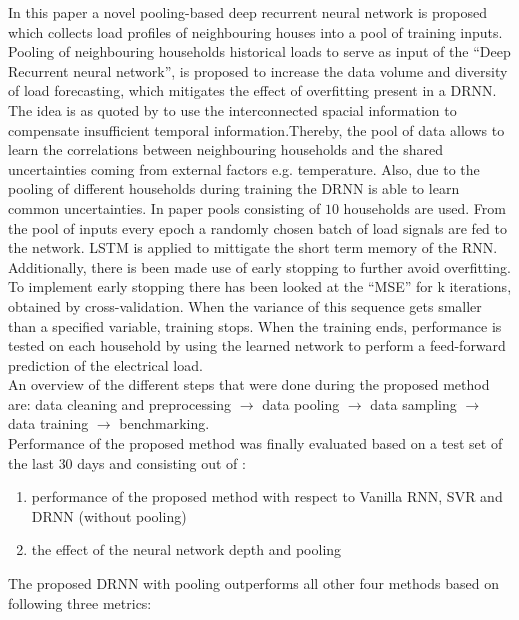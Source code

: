 In this paper \cite{Shi2018} a novel pooling-based deep recurrent neural network is proposed which collects load profiles of neighbouring houses into a pool of training inputs. Pooling of neighbouring households historical loads to serve as input of the ``Deep Recurrent neural network'', is proposed to increase the data volume and diversity of load forecasting, which mitigates the effect of overfitting present in a DRNN. The idea is as quoted by \cite{Shi2018} to use the interconnected spacial information to compensate insufficient temporal information.Thereby, the pool of data allows to learn the correlations between neighbouring households and the shared uncertainties coming from external factors e.g. temperature.  Also, due to the pooling of different households during training the DRNN is able to learn common uncertainties. In paper \cite{Shi2018} pools consisting of $ 10 $ households are used. From the pool of inputs every epoch a randomly chosen batch of load signals are fed to the network. LSTM is applied to mittigate the short term memory of the RNN. Additionally, there is been made use of early stopping to further avoid overfitting. To implement early stopping there has been looked at the ``MSE'' for k iterations, obtained by cross-validation. When the variance of this sequence gets smaller than a specified variable, training stops. When the training ends, performance is tested on each household by using the learned network to perform a feed-forward prediction of the electrical load.\\

An overview of the different steps that were done during the proposed method are: data cleaning and preprocessing $\rightarrow$ data pooling $\rightarrow$ data sampling $\rightarrow$ data training $\rightarrow$ benchmarking.\\

Performance of the proposed method was finally evaluated based on a test set of the last $ 30 $ days and consisting out of : 
\begin{enumerate}
	\item performance of the proposed method with respect to Vanilla RNN, SVR and DRNN (without pooling)
	\item the effect of the neural network depth and pooling
\end{enumerate}

The proposed DRNN with pooling outperforms all other four methods based on following three metrics:

